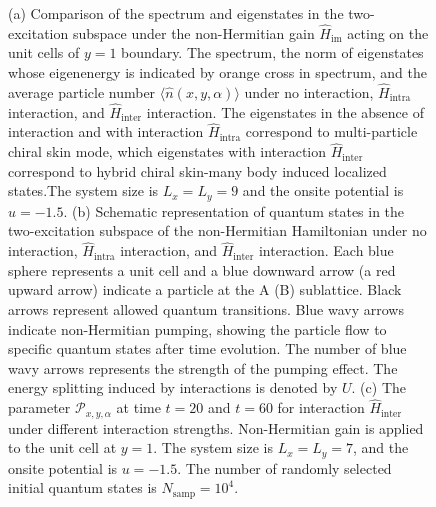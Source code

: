 \documentclass[longbibliography, aps, prx, amsmath, amssymb, amsfonts, twocolumn,superscriptaddress, footinbib]{revtex4-1}
\begin{document}
\begin{figure}[htbp]
{		%
		(a) Comparison of the spectrum and eigenstates in the two-excitation subspace under the non-Hermitian gain $\hat{H}_{\text{im}}$ acting on the unit cells of $y=1$ boundary. The spectrum, the norm of eigenstates whose eigenenergy is indicated by orange cross in spectrum, and the average particle number $\langle \hat{n}(x,y,\alpha) \rangle$
		under no interaction, $\hat{H}_{\text{intra}}$ interaction, and $\hat{H}_{\text{inter}}$ interaction. 
		The eigenstates in the absence of interaction and with interaction $\hat{H}_{\text{intra}}$ correspond to multi-particle chiral skin mode, which eigenstates with interaction $\hat{H}_{\text{inter}}$ correspond to hybrid chiral skin-many body induced localized states.The system size is $L_x=L_y=9$ and the onsite potential is $u=-1.5$. 
		(b) Schematic representation of quantum states in the two-excitation subspace of the non-Hermitian Hamiltonian under no interaction, $\hat{H}_{\text{intra}}$ interaction, and $\hat{H}_{\text{inter}}$ interaction. 
		Each blue sphere represents a unit cell and a blue downward arrow (a red upward arrow) indicate a particle at the A (B) sublattice. Black arrows represent allowed quantum transitions. 
		Blue wavy arrows indicate non-Hermitian pumping, showing the particle flow to specific quantum states after time evolution. The number of blue wavy arrows represents the strength of the pumping effect. The energy splitting induced by interactions is denoted by $U$.
		(c) The parameter $\mathcal{P}_{x,y,\alpha}$ at time $t=20$ and $t=60$ for interaction $\hat{H}_{\text{inter}}$ under different interaction strengths. Non-Hermitian gain is applied to the unit cell at $y=1$. The system size is $L_x=L_y=7$, and the onsite potential is $u=-1.5$. The number of randomly selected initial quantum states is $N_{\text{samp}}=10^4$.
		}
		\label{fig:02}
	\end{figure}
\end{document}

